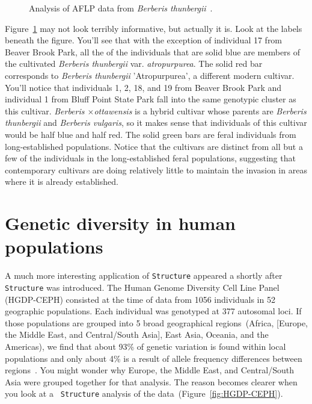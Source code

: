\begin{figure}
\caption{Analysis of AFLP data from {\it Berberis
    thunbergii}~\cite{Lubell-etal-2008}.}\label{fig:lubell-structure} 
\end{figure}

Figure~\ref{fig:lubell-structure} may not look terribly informative,
but actually it is. Look at the labels beneath the figure. You'll see
that with the exception of individual 17 from Beaver Brook Park, all
the of the individuals that are solid blue are members of the
cultivated {\it Berberis thunbergii\/} var. {\it atropurpurea}. The
solid red bar corresponds to {\it Berberis thunbergii\/}
'Atropurpurea', a different modern cultivar. You'll notice that
individuals 1, 2, 18, and 19 from Beaver Brook Park and individual 1
from Bluff Point State Park fall into the same genotypic cluster as
this cultivar. {\it Berberis $\times$ottawensis} is a hybrid cultivar
whose parents are {\it Berberis thunbergii\/} and {\it Berberis
  vulgaris\/}, so it makes sense that individuals of this cultivar
would be half blue and half red. The solid green bars are feral
individuals from long-established populations. Notice that the
cultivars are distinct from all but a few of the individuals in the
long-established feral populations, suggesting that contemporary
cultivars are doing relatively little to maintain the invasion in
areas where it is already established.

\section*{Genetic diversity in human populations}

A much more interesting application of {\tt Structure} appeared a
shortly after {\tt Structure} was introduced. The Human Genome
Diversity Cell Line Panel (HGDP-CEPH) consisted at
the time of data from 1056 individuals in 52 geographic
populations. Each individual was genotyped at 377 autosomal loci. If
those populations are grouped into 5 broad geographical
regions~(Africa, [Europe, the Middle East, and Central/South Asia],
East Asia, Oceania, and the Americas), we find that about 93\% of
genetic variation is found within local populations and only about 4\%
is a result of allele frequency differences between
regions~\cite{Rosenberg-etal-2002}. You might wonder why Europe, the
Middle East, and Central/South Asia were grouped together for that
analysis. The reason becomes clearer when you look at a {\tt
  Structure} analysis of the data~(Figure~\ref{fig:HGDP-CEPH}).

